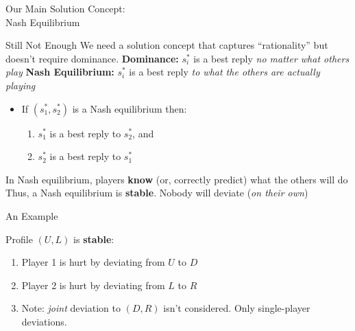 \begin{frame}[standout]
Our Main Solution Concept:\\
Nash Equilibrium
\end{frame}

\begin{frame}{Still Not Enough}
We need a solution concept that captures ``rationality'' but doesn't require dominance.
\vfill
\textbf{Dominance:} $s_i^*$ is a best reply \textit{no matter what others play}
\bsk
\textbf{Nash Equilibrium:} $s_i^*$ is a best reply \textit{to what the others are actually playing}
\begin{itemize}
    \item If $(s_1^*,s_2^*)$ is a Nash equilibrium then:
    \begin{enumerate}
        \item $s_1^*$ is a best reply to $s_2^*$, and
        \item $s_2^*$ is a best reply to $s_1^*$
    \end{enumerate}
\end{itemize}
\bsk
In Nash equilibrium, players \textbf{know} (or, correctly predict) what the others will do
\bsk
Thus, a Nash equilibrium is \textbf{stable}. Nobody will deviate (\textit{on their own})
\end{frame}

\begin{frame}{An Example}
\begin{center}
    \begin{matrixgame}[top={L,R}, left={U,D}, player names={P1,P2}]
    \end{matrixgame}
\end{center}
Profile $(U,L)$ is \textbf{stable}:
\begin{enumerate}
    \item Player 1 is hurt by deviating from $U$ to $D$
    \item Player 2 is hurt by deviating from $L$ to $R$
    \item Note: \textit{joint} deviation to $(D,R)$ isn't considered. Only single-player deviations.
\end{enumerate}
\bsk
{}
    
\end{frame}


